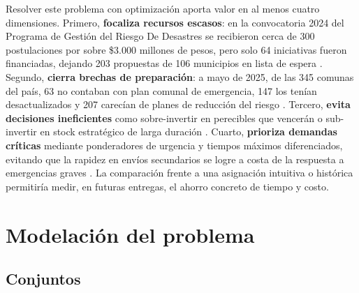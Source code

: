 \documentclass[letterpaper]{article}
\begin{document}
\begin{flushleft}
Resolver este problema con optimizaci\'on aporta valor en al menos cuatro dimensiones. Primero, \textbf{focaliza recursos escasos}: en la convocatoria 2024 del Programa de Gesti\'on del Riesgo De Desastres se recibieron cerca de 300 postulaciones por sobre \$3.000 millones de pesos, pero solo 64 iniciativas fueron financiadas, dejando 203 propuestas de 106 municipios en lista de espera \cite{dipres2026}. Segundo, \textbf{cierra brechas de preparaci\'on}: a mayo de 2025, de las 345 comunas del pa\'is, 63 no contaban con plan comunal de emergencia, 147 los ten\'ian desactualizados y 207 carec\'ian de planes de reducci\'on del riesgo \cite{dipres2026}. Tercero, \textbf{evita decisiones ineficientes} como sobre-invertir en perecibles que vencer\'an o sub-invertir en stock estrat\'egico de larga duraci\'on \cite{esfera2018}. Cuarto, \textbf{prioriza demandas cr\'iticas} mediante ponderadores de urgencia y tiempos m\'aximos diferenciados, evitando que la rapidez en env\'ios secundarios se logre a costa de la respuesta a emergencias graves \cite{esfera2018}. La comparaci\'on frente a una asignaci\'on intuitiva o hist\'orica permitir\'ia medir, en futuras entregas, el ahorro concreto de tiempo y costo.

\section{Modelaci\'on del problema}

\subsection{Conjuntos}


\end{flushleft}
\end{document}
